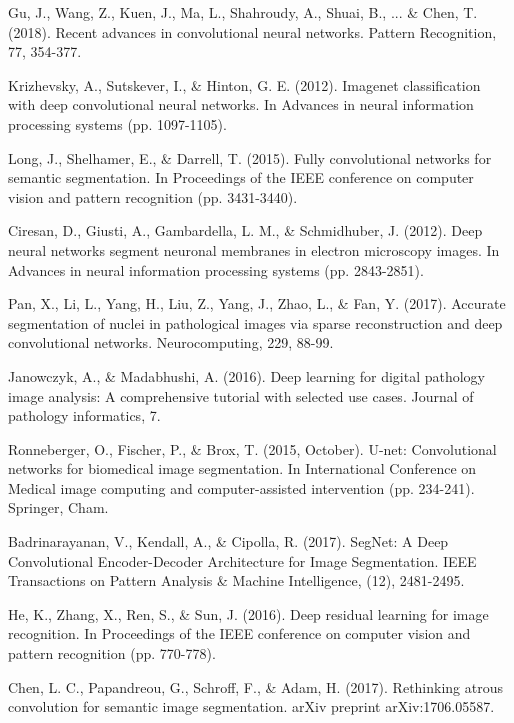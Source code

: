 \documentclass[10pt,twocolumn]{article}
\begin{document}

\begin{thebibliography}{}
%
%
Gu, J., Wang, Z., Kuen, J., Ma, L., Shahroudy, A., Shuai, B., ... \& Chen, T. (2018). Recent advances in convolutional neural networks. Pattern Recognition, 77, 354-377.

Krizhevsky, A., Sutskever, I., \& Hinton, G. E. (2012). Imagenet classification with deep convolutional neural networks. In Advances in neural information processing systems (pp. 1097-1105).

Long, J., Shelhamer, E., \& Darrell, T. (2015). Fully convolutional networks for semantic segmentation. In Proceedings of the IEEE conference on computer vision and pattern recognition (pp. 3431-3440).

Ciresan, D., Giusti, A., Gambardella, L. M., \& Schmidhuber, J. (2012). Deep neural networks segment neuronal membranes in electron microscopy images. In Advances in neural information processing systems (pp. 2843-2851).

Pan, X., Li, L., Yang, H., Liu, Z., Yang, J., Zhao, L., \& Fan, Y. (2017). Accurate segmentation of nuclei in pathological images via sparse reconstruction and deep convolutional networks. Neurocomputing, 229, 88-99.

Janowczyk, A., \& Madabhushi, A. (2016). Deep learning for digital pathology image analysis: A comprehensive tutorial with selected use cases. Journal of pathology informatics, 7.

Ronneberger, O., Fischer, P., \& Brox, T. (2015, October). U-net: Convolutional networks for biomedical image segmentation. In International Conference on Medical image computing and computer-assisted intervention (pp. 234-241). Springer, Cham.

Badrinarayanan, V., Kendall, A., \& Cipolla, R. (2017). SegNet: A Deep Convolutional Encoder-Decoder Architecture for Image Segmentation. IEEE Transactions on Pattern Analysis \& Machine Intelligence, (12), 2481-2495.

He, K., Zhang, X., Ren, S., \& Sun, J. (2016). Deep residual learning for image recognition. In Proceedings of the IEEE conference on computer vision and pattern recognition (pp. 770-778).

Chen, L. C., Papandreou, G., Schroff, F., \& Adam, H. (2017). Rethinking atrous convolution for semantic image segmentation. arXiv preprint arXiv:1706.05587.


\end{thebibliography}
\end{document}
